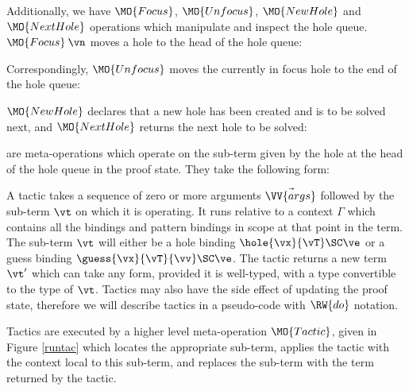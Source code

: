 \noindent
Additionally, we have $\MO{Focus}$, $\MO{Unfocus}$, $\MO{NewHole}$
and $\MO{NextHole}$
operations which manipulate and inspect
the hole queue. $\MO{Focus}\:\vn$ moves a hole to the head of the hole queue:


\noindent
Correspondingly, $\MO{Unfocus}$ moves the currently in focus hole to the
end of the hole queue:


\noindent
$\MO{NewHole}$ declares that a new hole has been created and is to be solved
next, and $\MO{NextHole}$ returns the next hole to be solved:


\noindent
{} are meta-operations which operate on the sub-term given by the
hole at the head of the hole queue in the proof state. They take the following
form:


A tactic takes a sequence of zero or more arguments $\vec{\VV{args}}$ followed
by the sub-term $\vt$ on which it is operating. It runs relative to a context
$\Gamma$ which contains all the bindings and pattern bindings in scope at that
point in the term. The sub-term $\vt$ will either be a hole binding
$\hole{\vx}{\vT}\SC\ve$ or a guess binding $\guess{\vx}{\vT}{\vv}\SC\ve$. The
tactic returns a new term $\vt'$ which can take any form, provided it is
well-typed, with a type convertible to the type of $\vt$. 
Tactics may also have the side effect of updating the proof state,
therefore we will describe tactics in a pseudo-code with $\RW{do}$ notation.

Tactics are executed by a higher level meta-operation $\MO{Tactic}$, 
given in Figure \ref{runtac} which
locates the appropriate sub-term, applies the tactic with the context
local to this sub-term, and
replaces the sub-term with the term returned by the
tactic. 

